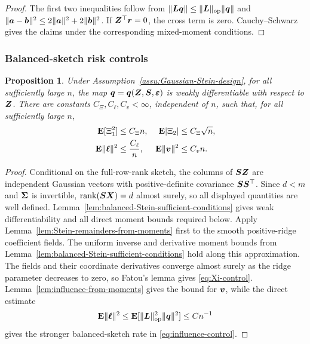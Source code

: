 \documentclass{article}
\theoremstyle{plain} %
\newtheorem{proposition}[theorem]{Proposition}
\theoremstyle{definition} %
\theoremstyle{definition} %
\begin{document}
\begin{proof}
The first two inequalities follow from
$\lVert\boldsymbol{L}\boldsymbol{q}\rVert\leq\lVert\boldsymbol{L}\rVert_{\rm op}\lVert\boldsymbol{q}\rVert$ and
$\lVert\boldsymbol{a}-\boldsymbol{b}\rVert^2\leq2\lVert\boldsymbol{a}\rVert^2+2\lVert\boldsymbol{b}\rVert^2$.
If $\boldsymbol{Z}^\top\boldsymbol{r}=0$, the cross term is zero.  Cauchy--Schwarz gives the
claims under the corresponding mixed-moment conditions.
\end{proof}

\subsubsection{Balanced-sketch risk controls}
\label{app:proof-Stein-risk-from-moments}

\begin{proposition}
\label{prop:Stein-risk-from-moments}
Under Assumption~\ref{assu:Gaussian-Stein-design}, for all sufficiently large
$n$, the map $\boldsymbol{q}=\boldsymbol{q}(\boldsymbol{Z},\boldsymbol{S},{\boldsymbol{\varepsilon} })$ is weakly differentiable with respect to $\boldsymbol{Z}$.
There are constants $C_\Xi,C_\ell,C_v<\infty$, independent of $n$, such that,
for all sufficiently large $n$,
\begin{align}
    {\mathbf{E}}[\Xi_1^2]&\leq C_\Xi n,
    &
    {\mathbf{E}}|\Xi_2|&\leq C_\Xi\sqrt n,
    \label{eq:Xi-control}\\
    {\mathbf{E}}\lVert\boldsymbol{\ell}\rVert^2&\leq \frac{C_\ell}{n},
    &
    {\mathbf{E}}\lVert\boldsymbol{v}\rVert^2&\leq C_v n.
    \label{eq:influence-control}
\end{align}
\end{proposition}

\begin{proof}
Conditional on the full-row-rank sketch, the columns of $\boldsymbol{S}\boldsymbol{Z}$ are
independent Gaussian vectors with positive-definite covariance
$\boldsymbol{S}\boldsymbol{S}^\top$.  Since $d<m$ and $\boldsymbol{\Sigma}$ is invertible,
$\operatorname{rank}(\boldsymbol{S}\boldsymbol{X})=d$ almost surely, so all displayed quantities are well defined.
Lemma~\ref{lem:balanced-Stein-sufficient-conditions} gives weak
differentiability and all direct moment bounds required below.
Apply Lemma~\ref{lem:Stein-remainders-from-moments} first to the smooth
positive-ridge coefficient fields. The uniform inverse and derivative
moment bounds from Lemma~\ref{lem:balanced-Stein-sufficient-conditions}
hold along this approximation. The fields and their coordinate derivatives
converge almost surely as the ridge parameter decreases to zero, so Fatou's
lemma gives \eqref{eq:Xi-control}. Lemma~\ref{lem:influence-from-moments}
gives the bound for $\boldsymbol{v}$, while the direct estimate
\begin{align*}
    {\mathbf{E}}\lVert\boldsymbol{\ell}\rVert^2
    \leq {\mathbf{E}}[\lVert\boldsymbol{L}\rVert_{\rm op}^2\lVert\boldsymbol{q}\rVert^2]
    \leq Cn^{-1}
\end{align*}
gives the stronger balanced-sketch rate in \eqref{eq:influence-control}.
\end{proof}
\end{document}
